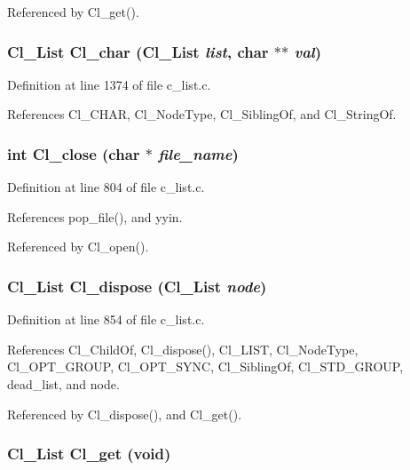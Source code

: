Referenced by Cl\_\-get().
\subsubsection{\setlength{\rightskip}{0pt plus 5cm}\bf{Cl\_\-List} Cl\_\-char (\bf{Cl\_\-List} {\em list}, char $\ast$$\ast$ {\em val})}\label{c__list_8c_6e52ca250e95b2902331d8dd7b07ff84}




Definition at line 1374 of file c\_\-list.c.

References Cl\_\-CHAR, Cl\_\-Node\-Type, Cl\_\-Sibling\-Of, and Cl\_\-String\-Of.
\subsubsection{\setlength{\rightskip}{0pt plus 5cm}int Cl\_\-close (char $\ast$ {\em file\_\-name})}\label{c__list_8c_127e03c017a405bb0423d40c8c5ce98a}




Definition at line 804 of file c\_\-list.c.

References pop\_\-file(), and yyin.

Referenced by Cl\_\-open().
\subsubsection{\setlength{\rightskip}{0pt plus 5cm}\bf{Cl\_\-List} Cl\_\-dispose (\bf{Cl\_\-List} {\em node})}\label{c__list_8c_5c08d5e28cdab2ecae7e94c5333685b0}




Definition at line 854 of file c\_\-list.c.

References Cl\_\-Child\-Of, Cl\_\-dispose(), Cl\_\-LIST, Cl\_\-Node\-Type, Cl\_\-OPT\_\-GROUP, Cl\_\-OPT\_\-SYNC, Cl\_\-Sibling\-Of, Cl\_\-STD\_\-GROUP, dead\_\-list, and node.

Referenced by Cl\_\-dispose(), and Cl\_\-get().
\subsubsection{\setlength{\rightskip}{0pt plus 5cm}\bf{Cl\_\-List} Cl\_\-get (void)}\label{c__list_8c_68d9263d1c6e20abe1b4fc20c1c4e1d2}




